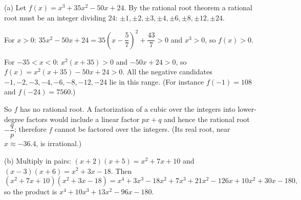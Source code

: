 (a) Let $f(x)=x^3+35x^2-50x+24$. By the rational root theorem a rational root must be an integer dividing $24$: $\pm1,\pm2,\pm3,\pm4,\pm6,\pm8,\pm12,\pm24$.

For $x>0$: $35x^2-50x+24=35\left(x-\dfrac{5}{7}\right)^2+\dfrac{43}{7}>0$ and $x^3>0$, so $f(x)>0$.

For $-35<x<0$: $x^2(x+35)>0$ and $-50x+24>0$, so $f(x)=x^2(x+35)-50x+24>0$. All the negative candidates $-1,-2,-3,-4,-6,-8,-12,-24$ lie in this range. (For instance $f(-1)=108$ and $f(-24)=7560$.)

So $f$ has no rational root. A factorization of a cubic over the integers into lower-degree factors would include a linear factor $px+q$ and hence the rational root $-\dfrac {q}{p}$; therefore $f$ cannot be factored over the integers. (Its real root, near $x\approx-36.4$, is irrational.)

(b) Multiply in pairs: $(x+2)(x+5)=x^2+7x+10$ and $(x-3)(x+6)=x^2+3x-18$. Then
\[
(x^2+7x+10)(x^2+3x-18)=x^4+3x^3-18x^2+7x^3+21x^2-126x+10x^2+30x-180,
\]
so the product is $\boxed{x^4+10x^3+13x^2-96x-180}$.
